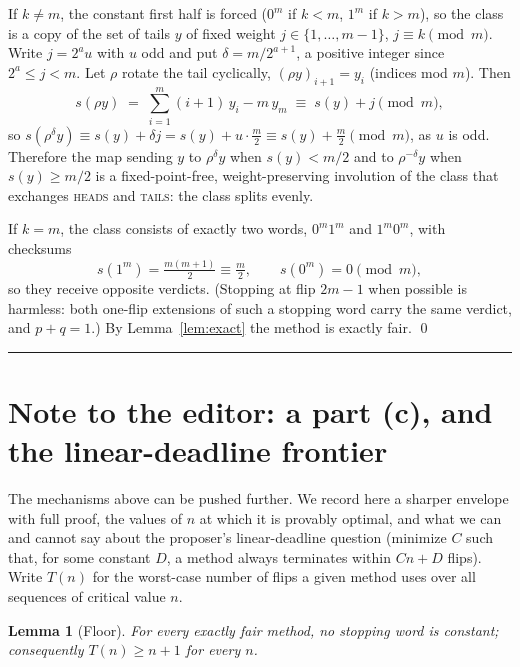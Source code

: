 \documentclass[11pt]{article}
\newtheorem{lemma}[theorem]{Lemma}
\theoremstyle{remark}
\newcommand{\head}{\textnormal{\textsc{heads}}}
\newcommand{\tail}{\textnormal{\textsc{tails}}}
\begin{document}
If $k\ne m$, the constant first half is forced ($0^m$ if $k<m$, $1^m$ if
$k>m$), so the class is a copy of the set of tails $y$ of fixed weight
$j\in\{1,\dots,m-1\}$, $j\equiv k\pmod m$. Write $j=2^au$ with $u$ odd and
put $\delta=m/2^{a+1}$, a positive integer since $2^a\le j<m$. Let $\rho$
rotate the tail cyclically, $(\rho y)_{i+1}=y_i$ (indices mod $m$). Then
\[
s(\rho y)\;=\;\sum_{i=1}^{m} (i+1)\,y_i - m\,y_m \;\equiv\; s(y)+j
\pmod m ,
\]
so $s(\rho^{\delta}y)\equiv s(y)+\delta j = s(y)+u\cdot\tfrac m2\equiv
s(y)+\tfrac m2 \pmod m$, as $u$ is odd. Therefore the map sending $y$ to
$\rho^{\delta}y$ when $s(y)<m/2$ and to $\rho^{-\delta}y$ when
$s(y)\ge m/2$ is a fixed-point-free, weight-preserving involution of the
class that exchanges \head{} and \tail{}: the class splits evenly.

If $k=m$, the class consists of exactly two words, $0^m1^m$ and $1^m0^m$,
with checksums
\[
s(1^m)=\tfrac{m(m+1)}2\equiv \tfrac m2, \qquad s(0^m)=0 \pmod m ,
\]
so they receive opposite verdicts. (Stopping at flip $2m-1$ when possible is
harmless: both one-flip extensions of such a stopping word carry the same
verdict, and $p+q=1$.) By Lemma~\ref{lem:exact} the method is exactly fair.
\qed

\bigskip
\begin{center}\rule{0.35\textwidth}{0.4pt}\end{center}

\section*{Note to the editor: a part (c), and the linear-deadline frontier}

The mechanisms above can be pushed further. We record here a sharper
envelope with full proof, the values of $n$ at which it is provably optimal,
and what we can and cannot say about the proposer's linear-deadline question
(minimize $C$ such that, for some constant $D$, a method always terminates
within $Cn+D$ flips). Write $T(n)$ for the worst-case number of flips a given
method uses over all sequences of critical value $n$.

\begin{lemma}[Floor]\label{lem:floor}
For every exactly fair method, no stopping word is constant; consequently
$T(n)\ge n+1$ for every $n$.
\end{lemma}
\end{document}
